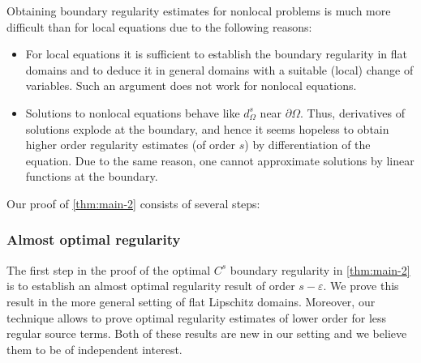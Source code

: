 \documentclass[11pt,reqno]{amsart}
\theoremstyle{plain}
\theoremstyle{definition}
\numberwithin{equation}{section}
\newcommand{\eps}{\varepsilon}
\newcommand{\1}{\mathbbm{1}}
\begin{document}
Obtaining boundary regularity estimates for nonlocal problems is much more difficult than for local equations due to the following reasons:
\begin{itemize}
    \item For local equations it is sufficient to establish the boundary regularity in flat domains and to deduce it in general domains with a suitable (local) change of variables. Such an argument does not work for nonlocal equations.
    \item Solutions to nonlocal equations behave like $d_{\Omega}^s$ near $\partial \Omega$. Thus, derivatives of solutions explode at the boundary, and hence it seems hopeless to obtain higher order regularity estimates (of order $s$) by differentiation of the equation. Due to the same reason, one cannot approximate solutions by linear functions at the boundary.
\end{itemize}

Our proof of \autoref{thm:main-2} consists of several steps:

\subsubsection{Almost optimal regularity}

The first step in the proof of the optimal $C^s$ boundary regularity in \autoref{thm:main-2} is to establish an almost optimal regularity result of order $s-\eps$. We prove this result in the more general setting of flat Lipschitz domains. Moreover, our technique allows to prove optimal regularity estimates of lower order for less regular source terms. Both of these results are new in our setting and we believe them to be of independent interest.
\end{document}
